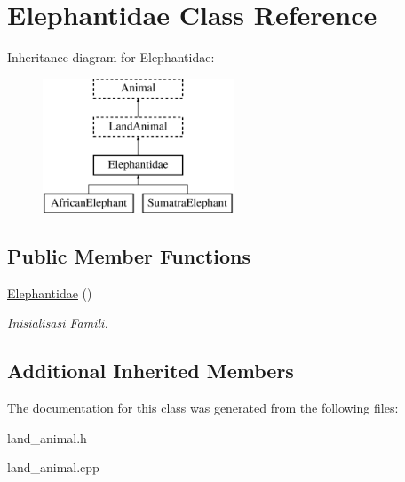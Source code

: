 \hypertarget{class_elephantidae}{}\section{Elephantidae Class Reference}
\label{class_elephantidae}
Inheritance diagram for Elephantidae\+:\begin{figure}[H]
\begin{center}
\leavevmode
\includegraphics[height=4.000000cm]{class_elephantidae}
\end{center}
\end{figure}
\subsection*{Public Member Functions}
\begin{DoxyCompactItemize}
\item 
\hyperlink{class_elephantidae_ae6315dec45db6ca389df2f2489b3b2f9}{Elephantidae} ()\hypertarget{class_elephantidae_ae6315dec45db6ca389df2f2489b3b2f9}{}\label{class_elephantidae_ae6315dec45db6ca389df2f2489b3b2f9}

\begin{DoxyCompactList}\small\item\em Inisialisasi Famili. \end{DoxyCompactList}\end{DoxyCompactItemize}
\subsection*{Additional Inherited Members}


The documentation for this class was generated from the following files\+:\begin{DoxyCompactItemize}
\item 
land\+\_\+animal.\+h\item 
land\+\_\+animal.\+cpp\end{DoxyCompactItemize}
